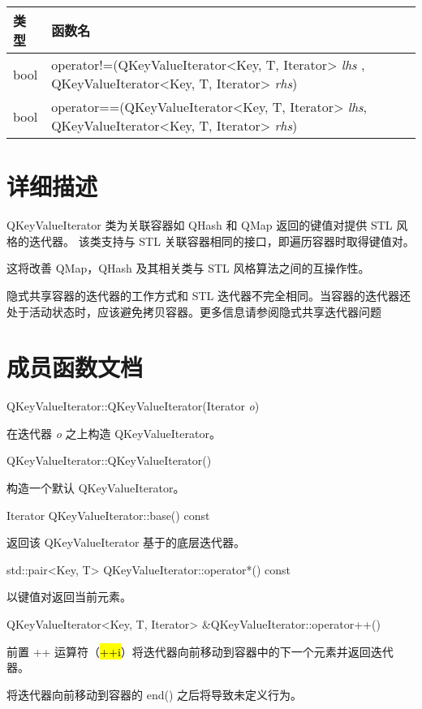 \begin{tabular}{|l|m{30em}|}
\hline
类型 	&函数名\\
\hline
bool & operator!=(QKeyValueIterator<Key, T, Iterator> \emph{lhs
}, QKeyValueIterator<Key, T, Iterator> \emph{rhs}) \\ 
\hline
bool &	operator==(QKeyValueIterator<Key, T, Iterator> \emph{lhs}, QKeyValueIterator<Key, T, Iterator> \emph{rhs}) \\ 
\hline
\end{tabular}

\section{详细描述}

QKeyValueIterator 类为关联容器如 QHash 和 QMap 返回的键值对提供 STL 风格的迭代器。
该类支持与 STL 关联容器相同的接口，即遍历容器时取得键值对。

这将改善 QMap，QHash 及其相关类与 STL 风格算法之间的互操作性。

\begin{notice}[警告]
隐式共享容器的迭代器的工作方式和 STL 迭代器不完全相同。当容器的迭代器还处于活动状态时，应该避免拷贝容器。更多信息请参阅隐式共享迭代器问题
\end{notice}

\section{成员函数文档}

QKeyValueIterator::QKeyValueIterator(Iterator \emph{o})

在迭代器 \emph{o} 之上构造 QKeyValueIterator。

QKeyValueIterator::QKeyValueIterator()

构造一个默认 QKeyValueIterator。

Iterator QKeyValueIterator::base() const

返回该 QKeyValueIterator 基于的底层迭代器。

std::pair<Key, T> QKeyValueIterator::operator*() const

以键值对返回当前元素。

QKeyValueIterator<Key, T, Iterator> \&QKeyValueIterator::operator++()

前置 ++ 运算符（\hl{++i}）将迭代器向前移动到容器中的下一个元素并返回迭代器。

\begin{notice}
将迭代器向前移动到容器的 end() 之后将导致未定义行为。
\end{notice}

